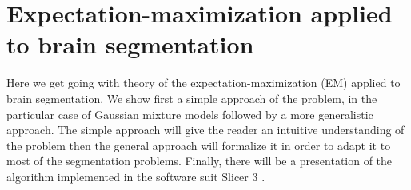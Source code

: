 \chapter{Expectation-maximization applied to brain segmentation}\label{sec:EM}
%
Here we get going with theory of the expectation-maximization (EM) applied to brain segmentation. We show first a simple approach of the problem, in the particular case of Gaussian mixture models followed by a more generalistic approach. The simple approach will give the reader an intuitive understanding of the problem then the general approach will formalize it in order to adapt it to most of the segmentation problems. Finally, there will be a presentation of the algorithm implemented in the software suit Slicer 3 \cite{22}.
%
